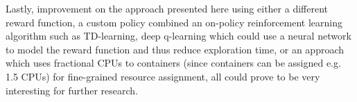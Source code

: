 Lastly, improvement on the approach presented here using either a different reward function, a custom policy combined an on-policy reinforcement learning algorithm such as TD-learning, deep q-learning which could use a neural network to model the reward function and thus reduce exploration time, or an approach which uses fractional CPUs to containers (since containers can be assigned e.g. 1.5 CPUs) for fine-grained resource assignment, all could prove to be very interesting for further research.



























